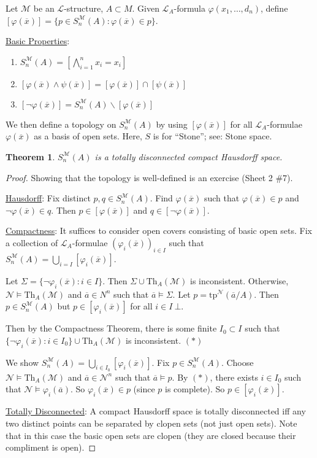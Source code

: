 \documentclass[]{article}
\theoremstyle{custhm}
\newtheorem{theorem}{Theorem}[section]
\theoremstyle{cusdef}
\theoremstyle{custhm}
\theoremstyle{custhm}
\theoremstyle{custhm}
\theoremstyle{ex}
\theoremstyle{custhm}
\theoremstyle{cusdef}
\theoremstyle{remark}
\theoremstyle{remark}
\renewcommand{\L}{\mathcal{L}}
\newcommand{\M}{\mathcal{M}}
\renewcommand{\phi}{\varphi}
\renewcommand{\bar}{\overline}
\newcommand{\Th}{\textrm{Th}}
\newcommand{\tp}{\textrm{tp}}
\newcommand{\false}{\bot}
\newcommand{\N}{\mathcal{N}}
\newcommand{\sman}{S_n^\M(A)}
\begin{document}
Let $\M$ be an $\L$-structure, $A\subset M$. Given $\L_A$-formula $\phi(x_1,\dots,d_n)$, define $[\phi(\bar{x})] = \{p \in S_n^\M(A):\phi(\bar{x}) \in p\}$.

\underline{Basic Properties}:
\begin{enumerate}[label = \arabic*.]
	\item $\sman = \left[\bigwedge_{i=1}^{n}x_i = x_i\right]$
	\item $\left[\phi(\bar{x})\land\psi(\bar{x})\right] = [\phi(\bar{x})]\cap [\psi(\bar{x})]$
	\item $\left[\neg \phi(\bar{x})\right] = \sman\backslash \left[\phi(\bar{x})\right]$
\end{enumerate}
We then define a topology on $\sman$ by using $[\phi(\bar{x})]$ for all $\L_A$-formulae $\phi(\bar{x})$ as a basis of open sets. Here, $S$ is for ``Stone''; see: Stone space.

\begin{theorem}
$\sman$ is a totally disconnected compact Hausdorff space.
\end{theorem}
\begin{proof}
Showing that the topology is well-defined is an exercise (Sheet 2 \#7).

\underline{Hausdorff}: Fix distinct $p,q \in \sman$. Find $\phi(\bar{x})$ such that $\phi(\bar{x}) \in p$ and $\neg\phi(\bar{x}) \in q$. Then $p \in [\phi(\bar{x})]$ and $q \in [\neg \phi(\bar{x})]$.

\underline{Compactness}: It suffices to consider open covers consisting of basic open sets. Fix a collection of $\L_A$-formulae $(\phi_i(\bar{x}))_{i\in I}$ such that $\sman = \bigcup_{i=I}\left[\phi_i(\bar{x})\right]$.

Let $\Sigma = \{\neg \phi_i(\bar{x}):i\in I\}$. Then $\Sigma \cup \Th_A(\M)$ is inconsistent. Otherwise, $\N\models \Th_A(\M)$ and $\bar{a}\in N^n$ such that $\bar{a} \models \Sigma$. Let $p = \tp^\N(\bar{a}/A)$. Then $p \in \sman$ but $p \in [\phi_i(\bar{x})]$ for all $i \in I\ \false$.

Then by the Compactness Theorem, there is some finite $I_0 \subset I$ such that $\{\neg \phi_i(\bar{x}):i\in I_0\}\cup\Th_A(\M)$ is inconsistent. $(\ast)$

We show $\sman = \bigcup_{i\in I_0}[\phi_i(\bar{x})]$. Fix $p \in \sman$. Choose $\N\models \Th_A(\M)$ and $\bar{a} \in \N^n$ such that $\bar{a}\models p$. By $(\ast)$, there exists $i \in I_0$ such that $\N\models \phi_i(\bar{a})$. So $\phi_i(\bar{x})\in p$ (since $p$ is complete). So $p \in [\phi_i(\bar{x})]$.

\underline{Totally Disconnected}: A compact Hausdorff space is totally disconnected iff any two distinct  points can be separated by clopen sets (not just open sets). Note that in this case the basic open sets are clopen (they are closed because their compliment is open).
\end{proof}
\end{document}
